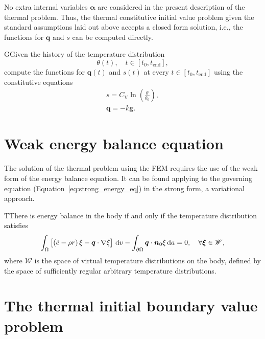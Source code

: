 No extra internal variables \(\bm \alpha\) are considered in the present description of the thermal problem.
Thus, the thermal constitutive initial value problem given the standard assumptions laid out above accepts a closed form solution, i.e., the functions for \(\bm q\) and \(s\) can be computed directly.

\begin{problem}
GGiven the history of the temperature distribution
\[\theta(t),\quad t\in[t_0, t_\text{end}],\]
compute the functions for $\bm q(t)$ and \(s(t)\) at every $t\in [t_0, t_\text{end}]$ using the constitutive equations
\begin{gather}
    s =C_{\mathrm{V}} \ln \left(\frac{\theta}{\theta_{0}}\right),\\
    \bm q = -k\bm g.
\end{gather}
\end{problem}

\section{Weak energy balance equation}

The solution of the thermal problem using the FEM requires the use of the weak form of the energy balance equation.
It can be found applying to the governing equation (Equation~\eqref{eq:strong_energy_eq}) in the strong form, a variational approach.
\begin{problem}
TThere is energy balance in the body if and only if the temperature distribution satisfies
    \begin{equation}
        \int_\Omega   \left[\left(\dot e - \rho r\right) \xi - \bm q\cdot \nabla \xi\right]\,\mathrm{d} v - \int_{\partial\Omega} \bm q\cdot \bm n_0 \xi\,\mathrm{d} a = 0,\quad \forall \bm{\xi} \in \mathscr{W},
    \end{equation}
 where $\mathscr{W}$ is the space of virtual temperature distributions on the body, defined by the space of sufficiently regular arbitrary temperature distributions.
 \end{problem}

\section{The thermal initial boundary value problem}

